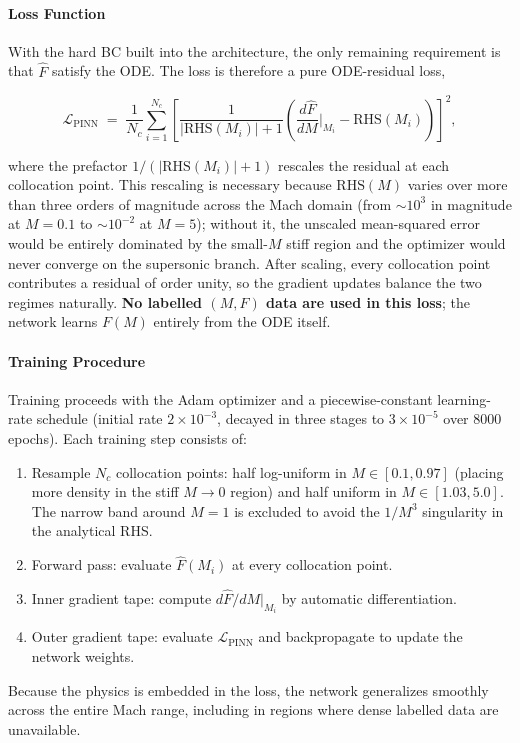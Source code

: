 \documentclass[11pt,a4paper]{report}
\begin{document}
\paragraph{Loss Function}
With the hard BC built into the architecture, the only remaining requirement is that $\hat{F}$ satisfy the ODE. The loss is therefore a pure ODE-residual loss,

\begin{equation}
\label{eq:pinn_loss}
\mathcal{L}_{\mathrm{PINN}} \;=\; \frac{1}{N_c} \sum_{i=1}^{N_c}
\left[
\frac{1}{|\mathrm{RHS}(M_i)| + 1}\left(\frac{d\hat{F}}{dM}\bigg|_{M_i} - \mathrm{RHS}(M_i)\right)
\right]^{2},
\end{equation}

where the prefactor $1/(|\mathrm{RHS}(M_i)| + 1)$ rescales the residual at each collocation point. This rescaling is necessary because $\mathrm{RHS}(M)$ varies over more than three orders of magnitude across the Mach domain (from $\sim\!10^{3}$ in magnitude at $M = 0.1$ to $\sim\!10^{-2}$ at $M = 5$); without it, the unscaled mean-squared error would be entirely dominated by the small-$M$ stiff region and the optimizer would never converge on the supersonic branch. After scaling, every collocation point contributes a residual of order unity, so the gradient updates balance the two regimes naturally. \textbf{No labelled $(M, F)$ data are used in this loss}; the network learns $F(M)$ entirely from the ODE itself.

\paragraph{Training Procedure}
Training proceeds with the Adam optimizer \cite{Kingma2015Adam} and a piecewise-constant learning-rate schedule (initial rate $2\times 10^{-3}$, decayed in three stages to $3\times 10^{-5}$ over $8000$ epochs). Each training step consists of:
\begin{enumerate}
    \item Resample $N_c$ collocation points: half log-uniform in $M \in [0.1, 0.97]$ (placing more density in the stiff $M\!\to\!0$ region) and half uniform in $M \in [1.03, 5.0]$. The narrow band around $M = 1$ is excluded to avoid the $1/M^3$ singularity in the analytical RHS.
    \item Forward pass: evaluate $\hat{F}(M_i)$ at every collocation point.
    \item Inner gradient tape: compute $d\hat{F}/dM\big|_{M_i}$ by automatic differentiation.
    \item Outer gradient tape: evaluate $\mathcal{L}_{\mathrm{PINN}}$ and backpropagate to update the network weights.
\end{enumerate}
Because the physics is embedded in the loss, the network generalizes smoothly across the entire Mach range, including in regions where dense labelled data are unavailable.
\end{document}
